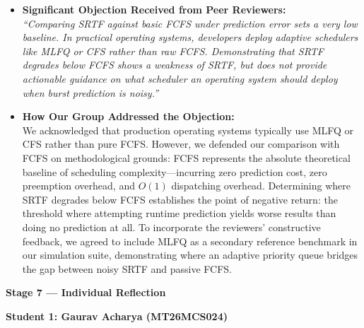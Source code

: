 \documentclass[11pt]{article}
\begin{document}
\begin{itemize}[leftmargin=1.5em]
    \item \textbf{Significant Objection Received from Peer Reviewers:} \\
    \textit{``Comparing SRTF against basic FCFS under prediction error sets a very low baseline. In practical operating systems, developers deploy adaptive schedulers like MLFQ or CFS rather than raw FCFS. Demonstrating that SRTF degrades below FCFS shows a weakness of SRTF, but does not provide actionable guidance on what scheduler an operating system should deploy when burst prediction is noisy.''}

    \vspace{0.3em}
    \item \textbf{How Our Group Addressed the Objection:} \\
    We acknowledged that production operating systems typically use MLFQ or CFS rather than pure FCFS. However, we defended our comparison with FCFS on methodological grounds: FCFS represents the absolute theoretical baseline of scheduling complexity---incurring zero prediction cost, zero preemption overhead, and $O(1)$ dispatching overhead. Determining where SRTF degrades below FCFS establishes the point of negative return: the threshold where attempting runtime prediction yields worse results than doing no prediction at all. To incorporate the reviewers' constructive feedback, we agreed to include MLFQ as a secondary reference benchmark in our simulation suite, demonstrating where an adaptive priority queue bridges the gap between noisy SRTF and passive FCFS.
\end{itemize}


\newpage
{\centering\fontsize{16}{20}\selectfont\textbf{Stage 7 --- Individual Reflection}\par}
\vspace{1em}

{\centering\fontsize{14}{16.8}\selectfont \textbf{Student 1: Gaurav Acharya (MT26MCS024)}\par}
\vspace{1em}
\end{document}
